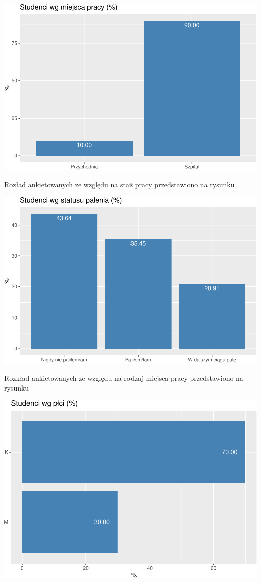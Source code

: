 \documentclass[
  openany]{book}
\begin{document}
\includegraphics{_main_files/figure-latex/unnamed-chunk-84-1.pdf}

Rozład ankietowanych ze względu na staż pracy przedstawiono na rysunku

\includegraphics{_main_files/figure-latex/unnamed-chunk-85-1.pdf}

Rozkład ankietowanych ze względu na rodzaj miejsca pracy
przedstawiono na rysunku

\includegraphics{_main_files/figure-latex/unnamed-chunk-86-1.pdf}
\end{document}
